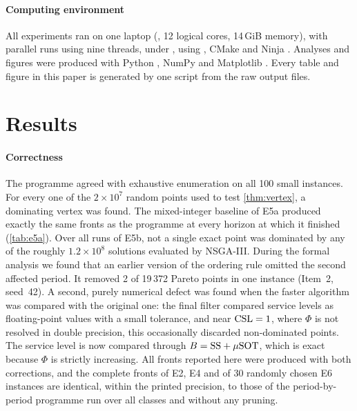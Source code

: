 \documentclass[preprint,12pt,authoryear]{elsarticle}
\begin{document}
\paragraph{Computing environment}
All experiments ran on one laptop (\verCpu, 12 logical cores, 14\,GiB memory), with
parallel runs using nine threads, under
\verOs, using \verGcc, CMake \verCmake{} and Ninja \verNinja. Analyses and figures were produced with
Python \verPython, NumPy \verNumpy{} and Matplotlib \verMatplotlib. Every table and figure
in this paper is generated by one script from the raw output files.

\section{Results}\label{sec:results}

\paragraph{Correctness}
The programme agreed with exhaustive enumeration on all 100 small instances. For every
one of the $2\times10^7$ random points used to test \cref{thm:vertex}, a dominating vertex
was found. The mixed-integer baseline of E5a produced exactly the same fronts as the
programme at every horizon at which it finished (\cref{tab:e5a}). Over all runs of E5b,
not a single exact point was dominated by any of the roughly $1.2\times10^8$ solutions
evaluated by NSGA-III. During the formal analysis we found that an earlier version of the
ordering rule omitted the second affected period. It removed 2 of 19\,372 Pareto points in
one instance (Item~2, seed~42). A second, purely numerical defect was found when the
faster algorithm was compared with the original one: the final filter compared service
levels as floating-point values with a small tolerance, and near $\mathrm{CSL}=1$, where
$\Phi$ is not resolved in double precision, this occasionally discarded non-dominated
points. The service level is now compared through $B=\mathrm{SS}+\mu\mathrm{SOT}$, which is exact because
$\Phi$ is strictly increasing. All fronts reported here were produced with both
corrections, and the complete fronts of E2, E4 and of 30 randomly chosen E6 instances are
identical, within the printed precision, to those of the period-by-period programme run
over all classes and without any pruning.
\end{document}
